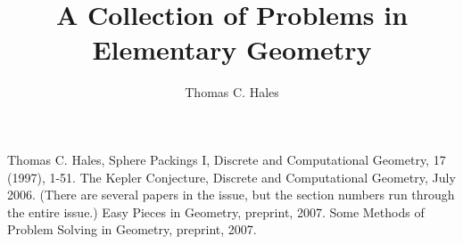 \documentclass[11pt]{amsart}
\title{A Collection of Problems in Elementary Geometry}
\author{Thomas C. Hales}
\def\svninfo{SVN:133, 4/7/2008}
\begin{document}
\maketitle

\symbolfootnote[0]{\svninfo}

\def\pdffigtemplate#1#2#3{%
\begin{figure}[htb]%
  \centering
  \myincludegraphics{\pdf/#1}
  \caption{#3}
  \label{tarski:fig:#2}%
\end{figure}%
}
\def\usegraphics{
\def\pdf{/Users/thomashales/Pictures/collect_geom}
\def\pdffig{\pdffigtemplate}
}
\def\pdffig#1#2#3{}
\def\myincludegraphics#1{\texttt{[image: noimage.eps]}}
 
\tableofcontents







\newpage
\begin{thebibliography}{CHMS94}
 Thomas C. Hales, Sphere Packings I,
    Discrete and Computational Geometry, 17 (1997), 1-51.
 The Kepler Conjecture, Discrete and
Computational Geometry, July 2006. (There are several papers in
the issue, but the section numbers run through the entire issue.)
 Easy Pieces in Geometry, preprint, 2007.
 Some Methods of Problem
Solving in Geometry, preprint, 2007.
\end{thebibliography}

{


}

\end{document}
